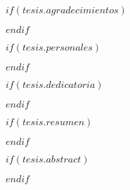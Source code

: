 \newpage
\begin{center}
\end{center}

\newpage
$if(tesis.agradecimientos)$

$endif$

\newpage
\begin{center}
\end{center}

\newpage
$if(tesis.personales)$

$endif$

\newpage
\begin{center}
\end{center}

\newpage
$if(tesis.dedicatoria)$

$endif$

\newpage
\begin{center}
\end{center}


\renewcommand*\contentsname{Tabla de contenidos}
\newpage
\tableofcontents

\newpage


\renewcommand{\listfigurename}{Lista de figuras}
\renewcommand{\listtablename}{Lista de tablas}
\listoffigures
\listoftables

\newpage
\printacronyms[name=Abreviaturas, pages={display=all,seq/use=false}]    

\newpage
$if(tesis.resumen)$

$endif$

\newpage
$if(tesis.abstract)$

$endif$


\newpage
{}